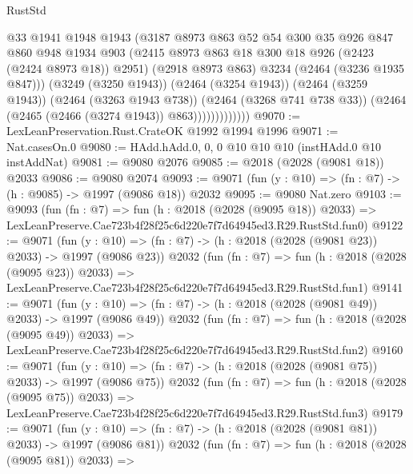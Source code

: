 \begin{lexlean}{RustStd}
\begin{coremodule}
                          @33
                          @1941
                          @1948
                          @1943
                          (@3187
                            @8973
                            @863
                            @52
                            @54
                            @300
                            @35
                            @926
                            @847
                            @860
                            @948
                            @1934
                            @903
                            (@2415 @8973 @863 @18 @300 @18 @926 (@2423 (@2424 @8973 @18)) @2951)
                            (@2918 @8973 @863)
                            @3234
                            (@2464 (@3236 @1935 @847)))
                          (@3249 (@3250 @1943))
                          (@2464 (@3254 @1943))
                          (@2464 (@3259 @1943))
                          (@2464 (@3263 @1943 @738))
                          (@2464 (@3268 @741 @738 @33))
                          (@2464 (@2465 (@2466 (@3274 @1943)) @863)))))))))))))
@9070 := LexLeanPreservation.Rust.CrateOK @1992 @1994 @1996
@9071 := Nat.casesOn.{0}
@9080 := HAdd.hAdd.{0, 0, 0} @10 @10 @10 (instHAdd.{0} @10 instAddNat)
@9081 := @9080 @2076
@9085 := @2018 (@2028 (@9081 @18)) @2033
@9086 := @9080 @2074
@9093 := @9071 (fun (y : @10) => (fn : @7) -> (h : @9085) -> @1997 (@9086 @18)) @2032
@9095 := @9080 Nat.zero
@9103 := @9093
    (fun (fn : @7) =>
    fun (h : @2018 (@2028 (@9095 @18)) @2033) =>
    LexLeanPreserve.Cae723b4f28f25c6d220e7f7d64945ed3.R29.RustStd.fun0)
@9122 := @9071
    (fun (y : @10) => (fn : @7) -> (h : @2018 (@2028 (@9081 @23)) @2033) -> @1997 (@9086 @23))
    @2032
    (fun (fn : @7) =>
    fun (h : @2018 (@2028 (@9095 @23)) @2033) =>
    LexLeanPreserve.Cae723b4f28f25c6d220e7f7d64945ed3.R29.RustStd.fun1)
@9141 := @9071
    (fun (y : @10) => (fn : @7) -> (h : @2018 (@2028 (@9081 @49)) @2033) -> @1997 (@9086 @49))
    @2032
    (fun (fn : @7) =>
    fun (h : @2018 (@2028 (@9095 @49)) @2033) =>
    LexLeanPreserve.Cae723b4f28f25c6d220e7f7d64945ed3.R29.RustStd.fun2)
@9160 := @9071
    (fun (y : @10) => (fn : @7) -> (h : @2018 (@2028 (@9081 @75)) @2033) -> @1997 (@9086 @75))
    @2032
    (fun (fn : @7) =>
    fun (h : @2018 (@2028 (@9095 @75)) @2033) =>
    LexLeanPreserve.Cae723b4f28f25c6d220e7f7d64945ed3.R29.RustStd.fun3)
@9179 := @9071
    (fun (y : @10) => (fn : @7) -> (h : @2018 (@2028 (@9081 @81)) @2033) -> @1997 (@9086 @81))
    @2032
    (fun (fn : @7) =>
    fun (h : @2018 (@2028 (@9095 @81)) @2033) =>

\end{coremodule}
\end{lexlean}
